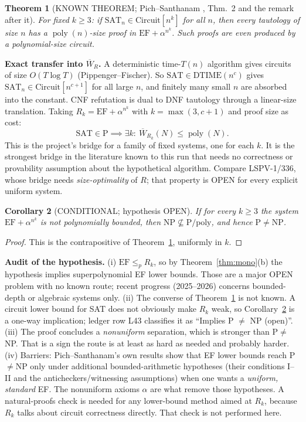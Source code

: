 \documentclass[11pt]{article}
\newtheorem{theorem}{Theorem}
\newtheorem{corollary}[theorem]{Corollary}
\theoremstyle{definition}
\newcommand{\Wb}{\overline W}
\begin{document}
\begin{theorem}[KNOWN THEOREM; Pich--Santhanam \cite{PS}, Thm.~2 and the remark after it]\label{thm:ps}
For fixed $k\ge3$: if $\mathrm{SAT}_n\in\mathrm{Circuit}[n^k]$ for all $n$, then every tautology of size $n$ has a $\operatorname{poly}(n)$-size proof in $\mathrm{EF}+\alpha^{n^k}$. Such proofs are even produced by a polynomial-size circuit.
\end{theorem}
\noindent\textbf{Exact transfer into $\Wb_R$.} A deterministic time-$T(n)$ algorithm gives circuits of size $O(T\log T)$ (Pippenger--Fischer). So $\mathrm{SAT}\in\mathrm{DTIME}(n^c)$ gives $\mathrm{SAT}_n\in\mathrm{Circuit}[n^{c+1}]$ for all large $n$, and finitely many small $n$ are absorbed into the constant. CNF refutation is dual to DNF tautology through a linear-size translation. Taking $R_k=\mathrm{EF}+\alpha^{n^k}$ with $k=\max(3,c+1)$ and proof size as cost:
\[
\boxed{\mathrm{SAT}\in\mathrm P\implies\exists k:\ \Wb_{R_k}(N)\le\operatorname{poly}(N).}
\]
This is the project's bridge for a family of fixed systems, one for each $k$. It is the strongest bridge in the literature known to this run that needs no correctness or provability assumption about the hypothetical algorithm. Compare LSPV-1/336, whose bridge needs \emph{size-optimality} of $R$; that property is OPEN for every explicit uniform system.

\begin{corollary}[CONDITIONAL; hypothesis OPEN]\label{cor:route}
If for every $k\ge3$ the system $\mathrm{EF}+\alpha^{n^k}$ is not polynomially bounded, then $\mathrm{NP}\not\subseteq\mathrm{P/poly}$, and hence $\mathrm P\ne\mathrm{NP}$.
\end{corollary}
\begin{proof}
This is the contrapositive of Theorem~\ref{thm:ps}, uniformly in $k$.
\end{proof}
\noindent\textbf{Audit of the hypothesis.} (i) $\mathrm{EF}\le_p R_k$, so by Theorem~\ref{thm:mono}(b) the hypothesis implies superpolynomial EF lower bounds. Those are a major OPEN problem with no known route; recent progress (2025--2026) concerns bounded-depth or algebraic systems only. (ii) The converse of Theorem~\ref{thm:ps} is not known. A circuit lower bound for SAT does not obviously make $R_k$ weak, so Corollary~\ref{cor:route} is a one-way implication; ledger row L43 classifies it as ``Implies P $\ne$ NP (open)''. (iii) The proof concludes a \emph{nonuniform} separation, which is stronger than P$\ne$NP. That is a sign the route is at least as hard as needed and probably harder. (iv) Barriers: Pich--Santhanam's own results show that EF lower bounds reach P$\ne$NP only under additional bounded-arithmetic hypotheses (their conditions I--II and the anticheckers/witnessing assumptions) when one wants a \emph{uniform, standard} EF. The nonuniform axioms $\alpha$ are what remove those hypotheses. A natural-proofs check is needed for any lower-bound method aimed at $R_k$, because $R_k$ talks about circuit correctness directly. That check is not performed here.
\end{document}
